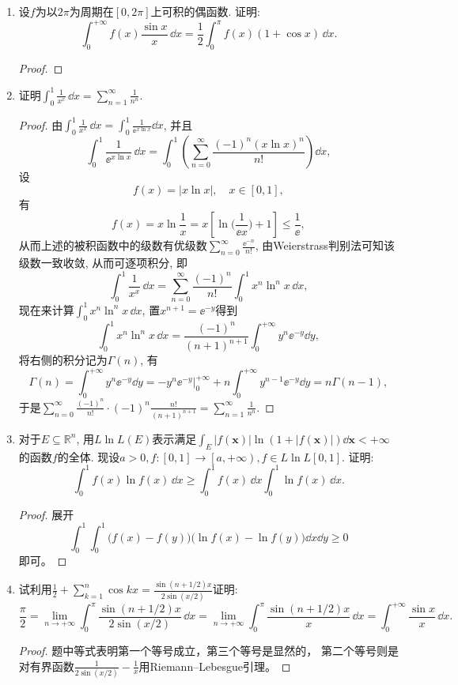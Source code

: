 \begin{a}
\begin{enumerate}
本题还有其他方法. 直接利用换元法与\(\csc x\)的展开式, 简述步骤如下.


\item 设\(f\)为以\(2\pi\)为周期在\([0,2\pi]\)上可积的偶函数. 证明:
\[\int_{0}^{+\infty}f(x)\frac{\sin x}{x}\,\dd x
=\frac{1}{2}\int_{0}^{\pi}f(x)(1+\cos x)\,\dd x.\]
\begin{proof}

\end{proof}
\item 证明\(\int_{0}^{1}\frac{1}{x^x}\,\dd x=\sum_{n=1}^{\infty}\frac{1}{n^n}\).
\begin{proof}
由\(\int_{0}^{1}\frac{1}{x^x}\,\dd x=\int_{0}^{1}\frac{1}{\ee^{x\ln x}}\dd x\), 
并且\[\int_{0}^{1}\frac{1}{\ee^{x\ln x}}\,\dd x
=\int_{0}^{1}\left(\sum_{n=0}^{\infty}\frac{(-1)^n(x\ln x)^n}{n!}\right)\dd x,\]
设
\[f(x)=\left|x\ln x\right|,\quad x\in[0,1],\]
有\[f(x)=x\ln\frac{1}{x}=x\left[\ln\Big(\frac{1}{\ee x}\Big)+1\right]\leqslant\frac{1}{\ee},\]
从而上述的被积函数中的级数有优级数\(\sum_{n=0}^{\infty}\frac{\ee^{-n}}{n!}\), 
由Weierstrass判别法可知该级数一致收敛, 从而可逐项积分, 即
\[\int_{0}^{1}\frac{1}{x^x}\,\dd x=\sum_{n=0}^{\infty}\frac{(-1)^n}{n!}\int_{0}^{1}x^n\ln^n x\,\dd x,\]
现在来计算\(\int_{0}^{1}x^n\ln^n x\,\dd x\), 置\(x^{n+1}=\ee^{-y}\)得到
\[\int_{0}^{1}x^n\ln^nx\,\dd x=\frac{(-1)^n}{(n+1)^{n+1}}\int_{0}^{+\infty}y^n\ee^{-y}\dd y,\]
将右侧的积分记为\(\Gamma(n)\), 有
\[\Gamma(n)=\int_{0}^{+\infty}y^n\ee^{-y}\dd y
=\left.-y^n\ee^{-y}\right|_0^{+\infty}+n\int_{0}^{+\infty}y^{n-1}\ee^{-y}\dd y
=n\Gamma(n-1),\]
于是\(\sum_{n=0}^{\infty}\frac{(-1)^n}{n!}\cdot(-1)^n\frac{n!}{(n+1)^{n+1}}
=\sum_{n=1}^{\infty}\frac{1}{n^n}.\)
\end{proof}
\item 对于\(E\subseteq\mathbb{R}^n\), 用\(L\ln L(E)\)表示满足\(\int_E|f(\boldsymbol{x})|\ln\left(1+|f(\boldsymbol{x})|\right)\dd\boldsymbol{x}<+\infty\)的函数\(f\)的全体. 
现设\(a>0,f:[0,1]\rightarrow\left[a,+\infty\right), f\in L\ln L[0,1]\). 证明:
\[\int_{0}^{1}f(x)\ln f(x)\,\dd x\geqslant\int_{0}^{1}f(x)\,\dd x\int_{0}^{1}\ln f(x)\,\dd x.\]
\begin{proof}
展开
\[\int_0^1\int_0^1\big(f(x)-f(y)\big)\big(\ln f(x)-\ln f(y)\big)\dd x\dd y\geqslant0\]
即可。
\end{proof}
\item 试利用\(\frac{1}{2}+\sum_{k=1}^{n}\cos kx=\frac{\sin\left(n+1/2\right)x}{2\sin(x/2)}\)证明:
\[\frac{\pi}{2}=\lim_{n\rightarrow+\infty}\int_{0}^{\pi}\frac{\sin\left(n+1/2\right)x}{2\sin(x/2)}\,\dd x
=\lim_{n\rightarrow+\infty}\int_{0}^{\pi}\frac{\sin\left(n+1/2\right)x}{x}\,\dd x
=\int_{0}^{+\infty}\frac{\sin x}{x}\,\dd x.\]
\begin{proof}
题中等式表明第一个等号成立，第三个等号是显然的，
第二个等号则是对有界函数\(\frac{1}{2\sin(x/2)}-\frac{1}{x}\)用Riemann--Lebesgue引理。
\end{proof}
\end{enumerate}
\end{a}

